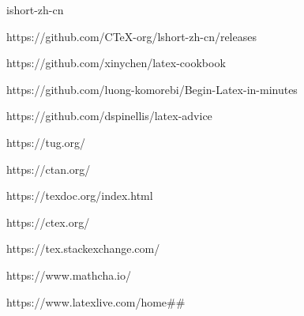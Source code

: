 \documentclass[11pt]{ctexart}
\begin{document}
ishort-zh-cn

https://github.com/CTeX-org/lshort-zh-cn/releases

https://github.com/xinychen/latex-cookbook

https://github.com/luong-komorebi/Begin-Latex-in-minutes

https://github.com/dspinellis/latex-advice

https://tug.org/

https://ctan.org/

https://texdoc.org/index.html

https://ctex.org/

https://tex.stackexchange.com/

https://www.mathcha.io/

https://www.latexlive.com/home\#\#



\end{document}

